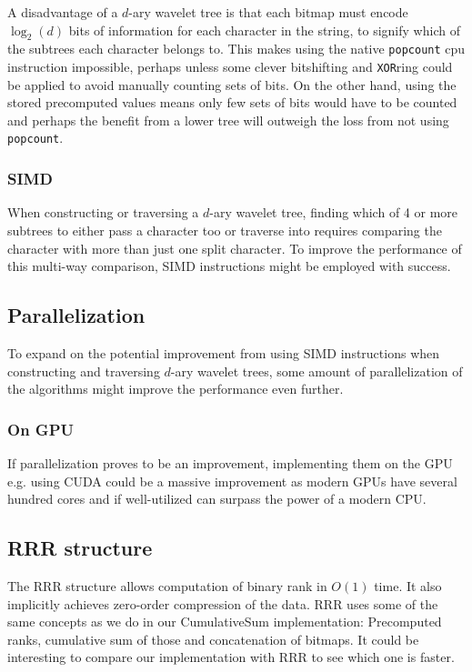 A disadvantage of a $d$-ary wavelet tree is that each bitmap must encode $\log_2(d)$ bits of information for each character in the string, to signify which of the subtrees each character belongs to.
This makes using the native \texttt{popcount} cpu instruction impossible, perhaps unless some clever bitshifting and \texttt{XOR}ring could be applied to avoid manually counting sets of bits.
On the other hand, using the stored precomputed values means only few sets of bits would have to be counted and perhaps the benefit from a lower tree will outweigh the loss from not using \texttt{popcount}.

\subsubsection{SIMD}
When constructing or traversing a $d$-ary wavelet tree, finding which of 4 or more subtrees to either pass a character too or traverse into requires comparing the character with more than just one split character.
To improve the performance of this multi-way comparison, SIMD instructions might be employed with success.


\subsection{Parallelization}
To expand on the potential improvement from using SIMD instructions when constructing and traversing $d$-ary wavelet trees, some amount of parallelization of the algorithms might improve the performance even further.
\subsubsection{On GPU}
If parallelization proves to be an improvement, implementing them on the GPU e.g. using CUDA could be a massive improvement as modern GPUs have several hundred cores and if well-utilized can surpass the power of a modern CPU.

\subsection{RRR structure}
The RRR structure allows computation of binary rank in $O(1)$ time. 
It also implicitly achieves zero-order compression of the data.
RRR uses some of the same concepts as we do in our CumulativeSum implementation: Precomputed ranks, cumulative sum of those and concatenation of bitmaps.
It could be interesting to compare our implementation with RRR to see which one is faster.

